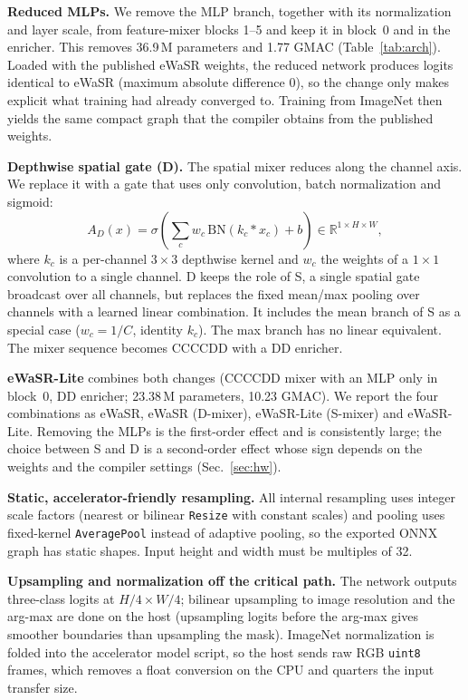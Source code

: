 \documentclass[conference]{IEEEtran}
\begin{document}
\textbf{Reduced MLPs.} We remove the MLP branch, together with its normalization and layer scale, from feature-mixer blocks 1--5 and keep it in block~0 and in the enricher. This removes 36.9\,M parameters and 1.77 GMAC (Table~\ref{tab:arch}). Loaded with the published eWaSR weights, the reduced network produces logits identical to eWaSR (maximum absolute difference 0), so the change only makes explicit what training had already converged to. Training from ImageNet then yields the same compact graph that the compiler obtains from the published weights.

\textbf{Depthwise spatial gate (D).} The spatial mixer reduces along the channel axis. We replace it with a gate that uses only convolution, batch normalization and sigmoid:
\begin{equation}
A_D(x)=\sigma\!\left(\textstyle\sum_{c} w_c\,\mathrm{BN}(k_c * x_c) + b\right)\in\mathbb{R}^{1\times H\times W},
\end{equation}
where $k_c$ is a per-channel $3\times3$ depthwise kernel and $w_c$ the weights of a $1\times1$ convolution to a single channel. D keeps the role of S, a single spatial gate broadcast over all channels, but replaces the fixed mean/max pooling over channels with a learned linear combination. It includes the mean branch of S as a special case ($w_c=1/C$, identity $k_c$). The max branch has no linear equivalent. The mixer sequence becomes CCCCDD with a DD enricher.

\textbf{eWaSR-Lite} combines both changes (CCCCDD mixer with an MLP only in block~0, DD enricher; 23.38\,M parameters, 10.23 GMAC). We report the four combinations as eWaSR, eWaSR (D-mixer), eWaSR-Lite (S-mixer) and eWaSR-Lite. Removing the MLPs is the first-order effect and is consistently large; the choice between S and D is a second-order effect whose sign depends on the weights and the compiler settings (Sec.~\ref{sec:hw}).

\textbf{Static, accelerator-friendly resampling.} All internal resampling uses integer scale factors (nearest or bilinear \texttt{Resize} with constant scales) and pooling uses fixed-kernel \texttt{AveragePool} instead of adaptive pooling, so the exported ONNX graph has static shapes. Input height and width must be multiples of 32.

\textbf{Upsampling and normalization off the critical path.} The network outputs three-class logits at $H/4\times W/4$; bilinear upsampling to image resolution and the arg-max are done on the host (upsampling logits before the arg-max gives smoother boundaries than upsampling the mask). ImageNet normalization is folded into the accelerator model script, so the host sends raw RGB \texttt{uint8} frames, which removes a float conversion on the CPU and quarters the input transfer size.
\end{document}

